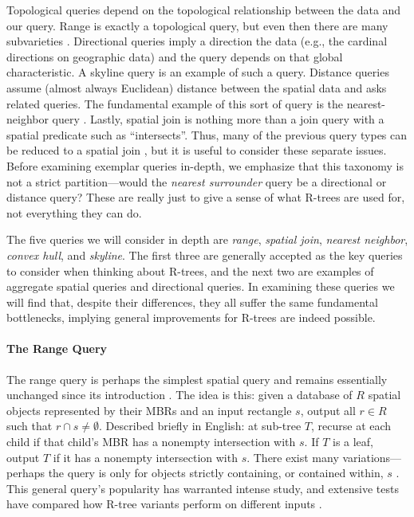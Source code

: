 Topological queries depend on the topological relationship between the data and our query.
Range is exactly a topological query, but even then there are many subvarieties \cite{papadiassellistheodoridisegenhofer95,gaedegunther98}.
Directional queries imply a direction the data (e.g., the cardinal directions on geographic data) and the query depends on that global characteristic.
A skyline query \cite{papadiastaofuseeger05} is an example of such a query.
Distance queries assume (almost always Euclidean) distance between the spatial data and asks related queries.
The fundamental example of this sort of query is the nearest-neighbor query \cite{roussopouloskelleyvincent95}.
Lastly, spatial join is nothing more than a join query with a spatial predicate \cite{brinkhoffkriegelseeger93} such as ``intersects''.
Thus, many of the previous query types can be reduced to a spatial join \cite{tocite}, but it is useful to consider these separate issues.
Before examining exemplar queries in-depth, we emphasize that this taxonomy is not a strict partition---would the \emph{nearest surrounder} query \cite{leeleeleong10} be a directional or distance query?
These are really just to give a sense of what R-trees are used for, not everything they can do.

The five queries we will consider in depth are \emph{range}, \emph{spatial join}, \emph{nearest neighbor}, \emph{convex hull}, and \emph{skyline}.
The first three are generally accepted as the key queries to consider when thinking about R-trees, and the next two are examples of aggregate spatial queries and directional queries.
In examining these queries we will find that, despite their differences, they all suffer the same fundamental bottlenecks, implying general improvements for R-trees are indeed possible.

\paragraph{The Range Query}
The range query is perhaps the simplest spatial query and remains essentially unchanged since its introduction \cite{guttman84}.
The idea is this: given a database of $R$ spatial objects represented by their MBRs and an input rectangle $s$, output all $r\in R$ such that $r\cap s\neq\emptyset$.
Described briefly in English: at sub-tree $T$, recurse at each child if that child's MBR has a nonempty intersection with $s$.
If $T$ is a leaf, output $T$ if it has a nonempty intersection with $s$.
There exist many variations---perhaps the query is only for objects strictly containing, or contained within, $s$ \cite{gaedegunther98}.
This general query's popularity has warranted intense study, and extensive tests have compared how R-tree variants perform on different inputs \cite{papadiassellistheodoridisegenhofer95}.


